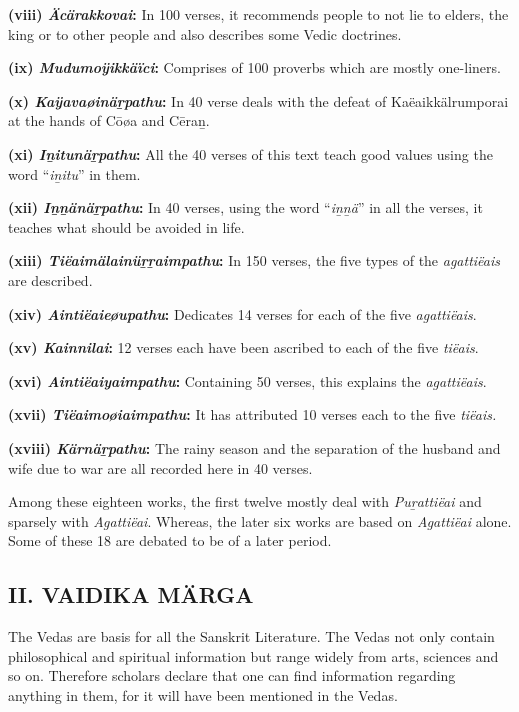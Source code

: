 \textbf{(viii) \textit{Äcärakkovai}:} In 100 verses, it recommends people to not lie to elders, the king or to other people and also describes some Vedic doctrines.

\textbf{(ix) \textit{Mudumoÿikkäïci}:} Comprises of 100 proverbs which are mostly one-liners.

\textbf{(x) \textit{Kaÿavaøinäṟpathu}:} In 40 verse deals with the defeat of Kaëaikkälrumporai at the hands of Cōøa and Cēraṉ.

\textbf{(xi) \textit{Iṉitunäṟpathu}:} All the 40 verses of this text teach good values using the word “\textit{iṉitu}” in them.

\textbf{(xii) \textit{Iṉṉänäṟpathu}:} In 40 verses, using the word “\textit{iṉṉä}” in all the verses, it teaches what should be avoided in life.

\textbf{(xiii) \textit{Tiëaimälainüṟṟaimpathu}:} In 150 verses, the five types of the \textit{agattiëais} are described.

\textbf{(xiv) \textit{Aintiëaieøupathu}:} Dedicates 14 verses for each of the five \textit{agattiëais}.

\textbf{(xv) \textit{Kainnilai}:} 12 verses each have been ascribed to each of the five \textit{tiëais}.

\textbf{(xvi) \textit{Aintiëaiyaimpathu}:} Containing 50 verses, this explains the \textit{agattiëais}.

\textbf{(xvii) \textit{Tiëaimoøiaimpathu}:} It has attributed 10 verses each to the five \textit{tiëais.}

\textbf{(xviii) \textit{Kärnäṟpathu}:} The rainy season and the separation of the husband and wife due to war are all recorded here in 40 verses.

Among these eighteen works, the first twelve mostly deal with \textit{Puṟattiëai} and sparsely with \textit{Agattiëai}. Whereas, the later six works are based on \textit{Agattiëai} alone. Some of these 18 are debated to be of a later period.


\subsection*{II. VAIDIKA MÄRGA}

The Vedas are basis for all the Sanskrit Literature. The Vedas not only contain philosophical and spiritual information but range widely from arts, sciences and so on. Therefore scholars declare that one can find information regarding anything in them, for it will have been mentioned in the Vedas.


